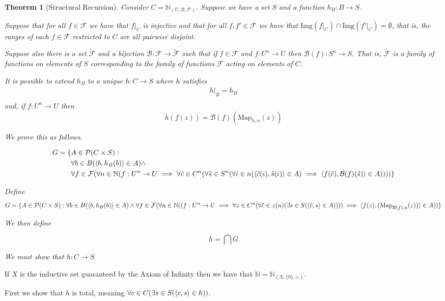 \documentclass[12pt]{article}
\theoremstyle{break}
\theoremstyle{break}
\newtheorem{theorem}{Theorem}[section]
\theoremstyle{break}
\theoremstyle{break}
\theoremstyle{break}
\newtheorem{informal definition}[definition]{Informal Definition}
\begin{document}
\begin{theorem}[Structural Recursion]
Consider $C = \mathbb{N}_{(U, B, \mathcal{F})}$.
Suppose we have a set $S$ and a function $h_B:B \to S$.

Suppose that for all $f\in \mathcal{F}$ we have that $f|_C$ is injective and that for all $f, f' \in \mathcal{F}$ we have that $\text{Img}(f|_C) \cap \text{Img}(f'|_C) = \emptyset$, that is, the ranges of each $f\in \mathcal{F}$ restricted to $C$ are all pairwise disjoint.

Suppose also there is a set $\tilde{\mathcal{F}}$ and a bijection $\mathcal{B}: \mathcal{F} \to \tilde{\mathcal{F}}$ such that if $f\in \mathcal{F}$ and $f: U^n \to U$ then $\mathcal{B}(f): S^n \to S$.
That is, $\tilde{\mathcal{F}}$ is a family of functions on elements of $S$ corresponding to the family of functions $\mathcal{F}$ acting on elements of $C$.

It is possible to extend $h_B$ to a unique $h:C \to S$ where $h$ satisfies
\begin{align*}
h|_B = h_B \\
\end{align*}
and, if $f:U^n \to U$ then
$$
h(f(z)) = \mathcal{B}(f)(\text{Map}_{h, n}(z))
$$

We prove this as follows.

\tiny
\begin{align*}
G = \{&A \in \mathcal{P}(C \times S): \\
&\forall b \in B (\Braket{b, h_B(b)} \in A) \land \\
&\forall f \in \mathcal{F}(\forall n \in \mathbb{N}(f:U^n \to U \implies \forall \tilde{c} \in C^n(\forall \tilde{s} \in S^n(\forall i \in n(\Braket{\tilde{c}(i), \tilde{s}(i)} \in A) \implies \Braket{f(\tilde{c}), \mathcal{B}(f)(\tilde{s})}\in A))))\}
\end{align*}


Define
\tiny
$$
G = \{A\in \mathcal{P}(C\times S): \forall b \in B (\Braket{b, h_B(b)} \in A) \land \forall f \in \mathcal{F}(\forall n \in \mathbb{N}((f:U^n \to U \implies \forall z \in C^n(\forall \tilde{c}\in z(n)(\exists s \in S(\Braket{\tilde{c}, s} \in A)))) \implies \braket{f(z), (\text{Map}_{\mathcal{B}(f), n}(z))} \in A))\}
$$
\normalsize

We then define

$$
h = \bigcap G
$$

We must show that $h: C \to S$


\end{theorem}


If $X$ is the inductive set guaranteed by the Axiom of Infinity then we have that $\mathbb{N} = \mathbb{N}_{(X, \{0\}, +)}$.

First we show that $h$ is total, meaning $\forall c \in C (\exists s \in S(\Braket{c, s}\in h))$.
\end{document}
